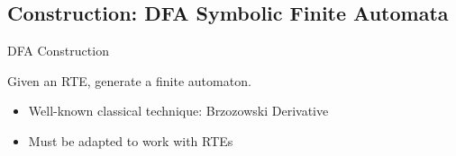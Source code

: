 \subsection{Construction: DFA Symbolic Finite Automata}

{  
\begin{frame}{ DFA Construction}

  Given an RTE, generate a finite automaton.

  \begin{itemize}
  \item Well-known classical technique: Brzozowski Derivative
  \item Must be adapted to work with RTEs
  \end{itemize}
\end{frame}
}



